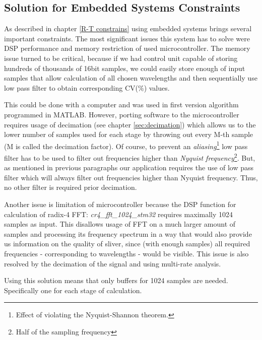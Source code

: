 \documentclass[twoside]{ctuthesis}
\theoremstyle{plain}
\theoremstyle{definition}
\theoremstyle{note}
\begin{document}
\subsection{Solution for Embedded Systems Constraints}
\label{sec:SolutionForEmbedded}
As described in chapter \ref{R-T constrains} using embedded systems brings several important constraints. The most significant issues this system has to solve were DSP performance and memory restriction of used microcontroller. The memory issue turned to be critical, because if we had control unit capable of storing hundreds of thousands of 16bit samples, we could easily store enough of input samples that allow calculation of all chosen wavelengths and then sequentially use low pass filter to obtain corresponding CV(\%) values. 

This could be done with a computer and was used in first version algorithm programmed in MATLAB. However, porting software to the microcontroller requires usage of decimation (see chapter \ref{sec:decimation}) which allows us to the lower number of samples used for each stage by throwing out every M-th sample (M is called the decimation factor). Of course, to prevent an \textit{aliasing}\footnote{Effect of violating the Nyquist-Shannon theorem.} low pass filter has to be used to filter out frequencies higher than \textit{Nyquist frequency}\footnote{Half of the sampling frequency}. But, as mentioned in previous paragraphs our application requires the use of low pass filter which will always filter out frequencies higher than Nyquist frequency. Thus, no other filter is required prior decimation.

Another issue is limitation of microcontroller because the DSP function for calculation of radix-4 FFT: \textit{cr4\_fft\_1024\_stm32} requires maximally 1024 samples as input. This disallows usage of FFT on a much larger amount of samples and processing its frequency spectrum in a way that would also provide us information on the quality of sliver, since (with enough samples) all required frequencies - corresponding to wavelengths - would be visible. This issue is also resolved by the decimation of the signal and using multi-rate analysis. 

Using this solution means that only buffers for 1024 samples are needed. Specifically one for each stage of calculation.
\end{document}

